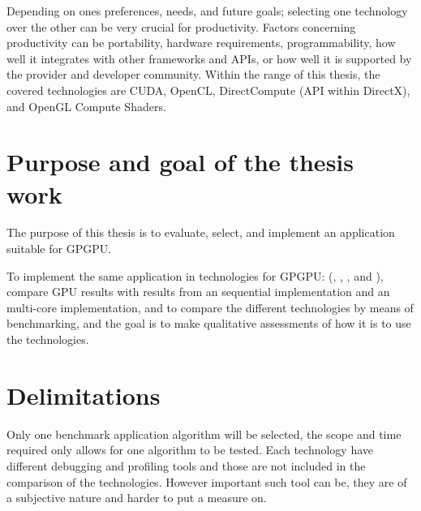 Depending on ones preferences, needs, and future goals; selecting one technology over the other can be very crucial for productivity. Factors concerning productivity can be portability, hardware requirements, programmability, how well it integrates with other frameworks and \gls{API}s, or how well it is supported by the provider and developer community. Within the range of this thesis, the covered technologies are \gls{CUDA}, \gls{OpenCL}, DirectCompute (\gls{API} within DirectX), and \gls{OpenGL} Compute Shaders.

\section{Purpose and goal of the thesis work}
The purpose of this thesis is to evaluate, select, and implement an application suitable for \gls{GPGPU}.

To implement the same application in technologies for \gls{GPGPU}: ({\CU}, {\OCL}, {\DX}, and {\GL}), compare \gls{GPU} results with results from an sequential {\CPP} implementation and an multi-core {\OMP} implementation, and to compare the different technologies by means of benchmarking, and the goal is to make qualitative assessments of how it is to use the technologies.

\section{Delimitations}
Only one benchmark application algorithm will be selected, the scope and time required only allows for one algorithm to be tested. Each technology have different debugging and profiling tools and those are not included in the comparison of the technologies. However important such tool can be, they are of a subjective nature and harder to put a measure on.